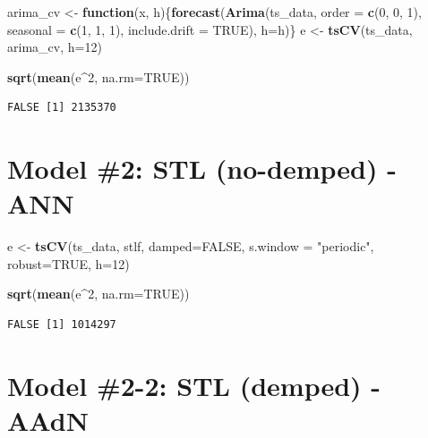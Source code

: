 \documentclass[openany]{book}
\newenvironment{Shaded}{\begin{snugshade}}{\end{snugshade}}
\newcommand{\KeywordTok}[1]{\textcolor[rgb]{0.13,0.29,0.53}{\textbf{#1}}}
\newcommand{\DataTypeTok}[1]{\textcolor[rgb]{0.13,0.29,0.53}{#1}}
\newcommand{\DecValTok}[1]{\textcolor[rgb]{0.00,0.00,0.81}{#1}}
\newcommand{\StringTok}[1]{\textcolor[rgb]{0.31,0.60,0.02}{#1}}
\newcommand{\OtherTok}[1]{\textcolor[rgb]{0.56,0.35,0.01}{#1}}
\newcommand{\ControlFlowTok}[1]{\textcolor[rgb]{0.13,0.29,0.53}{\textbf{#1}}}
\newcommand{\OperatorTok}[1]{\textcolor[rgb]{0.81,0.36,0.00}{\textbf{#1}}}
\newcommand{\NormalTok}[1]{#1}
\begin{document}
\begin{Shaded}
\begin{Highlighting}[]
\NormalTok{arima_cv <-}\StringTok{ }\ControlFlowTok{function}\NormalTok{(x, h)\{}\KeywordTok{forecast}\NormalTok{(}\KeywordTok{Arima}\NormalTok{(ts_data, }\DataTypeTok{order =} \KeywordTok{c}\NormalTok{(}\DecValTok{0}\NormalTok{, }\DecValTok{0}\NormalTok{, }\DecValTok{1}\NormalTok{), }\DataTypeTok{seasonal =} \KeywordTok{c}\NormalTok{(}\DecValTok{1}\NormalTok{, }\DecValTok{1}\NormalTok{, }\DecValTok{1}\NormalTok{),  }\DataTypeTok{include.drift =} \OtherTok{TRUE}\NormalTok{), }\DataTypeTok{h=}\NormalTok{h)\}}
\NormalTok{e <-}\StringTok{ }\KeywordTok{tsCV}\NormalTok{(ts_data, arima_cv, }\DataTypeTok{h=}\DecValTok{12}\NormalTok{)}

\KeywordTok{sqrt}\NormalTok{(}\KeywordTok{mean}\NormalTok{(e}\OperatorTok{^}\DecValTok{2}\NormalTok{, }\DataTypeTok{na.rm=}\OtherTok{TRUE}\NormalTok{))}
\end{Highlighting}
\end{Shaded}

\begin{verbatim}
FALSE [1] 2135370
\end{verbatim}

\chapter{Model \#2: STL (no-demped) -
ANN}\label{model-2-stl-no-demped---ann-1}

\begin{Shaded}
\begin{Highlighting}[]
\NormalTok{e <-}\StringTok{ }\KeywordTok{tsCV}\NormalTok{(ts_data, stlf, }\DataTypeTok{damped=}\OtherTok{FALSE}\NormalTok{, }\DataTypeTok{s.window =} \StringTok{"periodic"}\NormalTok{, }\DataTypeTok{robust=}\OtherTok{TRUE}\NormalTok{, }\DataTypeTok{h=}\DecValTok{12}\NormalTok{)}

\KeywordTok{sqrt}\NormalTok{(}\KeywordTok{mean}\NormalTok{(e}\OperatorTok{^}\DecValTok{2}\NormalTok{, }\DataTypeTok{na.rm=}\OtherTok{TRUE}\NormalTok{))}
\end{Highlighting}
\end{Shaded}

\begin{verbatim}
FALSE [1] 1014297
\end{verbatim}

\chapter{Model \#2-2: STL (demped) -
AAdN}\label{model-2-2-stl-demped---aadn-1}
\end{document}
